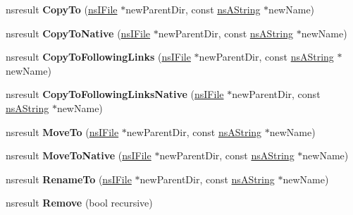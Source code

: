 \begin{DoxyCompactItemize}
nsresult {\bfseries Copy\+To} (\hyperlink{interfacens_i_file}{ns\+I\+File} $\ast$new\+Parent\+Dir, const \hyperlink{structns_string_container}{ns\+A\+String} $\ast$new\+Name)
\item 
\mbox{\label{interfacens_i_file_a4c522cd92f32bf41548a54137db997d8}} 
nsresult {\bfseries Copy\+To\+Native} (\hyperlink{interfacens_i_file}{ns\+I\+File} $\ast$new\+Parent\+Dir, const \hyperlink{structns_string_container}{ns\+A\+String} $\ast$new\+Name)
\item 
\mbox{\label{interfacens_i_file_a4d84b6fa33fb977bd0f38fc5b79bf0ce}} 
nsresult {\bfseries Copy\+To\+Following\+Links} (\hyperlink{interfacens_i_file}{ns\+I\+File} $\ast$new\+Parent\+Dir, const \hyperlink{structns_string_container}{ns\+A\+String} $\ast$new\+Name)
\item 
\mbox{\label{interfacens_i_file_af63616b760e43fbf1b91c3c015b653c6}} 
nsresult {\bfseries Copy\+To\+Following\+Links\+Native} (\hyperlink{interfacens_i_file}{ns\+I\+File} $\ast$new\+Parent\+Dir, const \hyperlink{structns_string_container}{ns\+A\+String} $\ast$new\+Name)
\item 
\mbox{\label{interfacens_i_file_a437b368252153af2d556a25485cb6fe8}} 
nsresult {\bfseries Move\+To} (\hyperlink{interfacens_i_file}{ns\+I\+File} $\ast$new\+Parent\+Dir, const \hyperlink{structns_string_container}{ns\+A\+String} $\ast$new\+Name)
\item 
\mbox{\label{interfacens_i_file_a772cf46b958d9db66603c70fb8a423be}} 
nsresult {\bfseries Move\+To\+Native} (\hyperlink{interfacens_i_file}{ns\+I\+File} $\ast$new\+Parent\+Dir, const \hyperlink{structns_string_container}{ns\+A\+String} $\ast$new\+Name)
\item 
\mbox{\label{interfacens_i_file_a7873bf15e4803b232e22ccf00b237248}} 
nsresult {\bfseries Rename\+To} (\hyperlink{interfacens_i_file}{ns\+I\+File} $\ast$new\+Parent\+Dir, const \hyperlink{structns_string_container}{ns\+A\+String} $\ast$new\+Name)
\item 
\mbox{\label{interfacens_i_file_ac6840a7fc8e8bc435fbd9d93e85493ce}} 
nsresult {\bfseries Remove} (bool recursive)

\end{DoxyCompactItemize}

